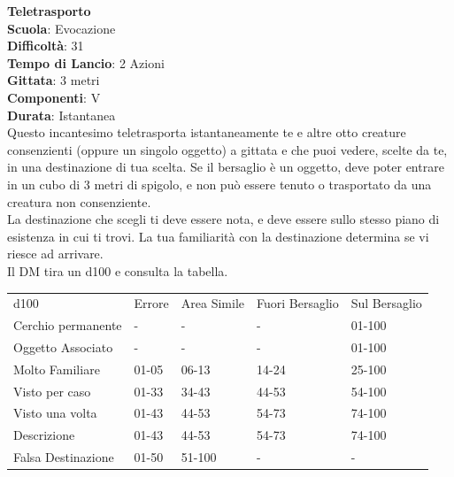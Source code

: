 \begin{multicols}{2}
\medskip\textbf{Teletrasporto}\\
\textbf{Scuola}: Evocazione\\
\textbf{Difficoltà}: 31\\
\textbf{Tempo di Lancio}: 2 Azioni\\
\textbf{Gittata}: 3 metri\\
\textbf{Componenti}: V\\
\textbf{Durata}: Istantanea\\
Questo incantesimo teletrasporta istantaneamente te e altre otto creature consenzienti (oppure un singolo oggetto) a gittata e che puoi vedere, scelte da te, in una destinazione di tua scelta. Se il bersaglio è un oggetto, deve poter entrare in un cubo di 3 metri di spigolo, e non può essere tenuto o trasportato da una creatura non consenziente.\\
La destinazione che scegli ti deve essere nota, e deve essere sullo stesso piano di esistenza in cui ti trovi. La tua familiarità con la destinazione determina se vi riesce ad arrivare.\\
Il DM tira un d100 e consulta la tabella.
\end{multicols}
\medskip
\begin{tabular}{lllll}
\toprule
d100 				&	Errore		&	Area Simile	&Fuori Bersaglio&Sul Bersaglio\\
Cerchio permanente	&-	&-	&-	&01-100\\
Oggetto Associato	&-	&-	&-	&01-100\\
Molto Familiare		&01-05	&06-13	&14-24	&25-100\\
Visto per caso		&01-33	&34-43	&44-53	&54-100\\
Visto una volta		&01-43	&44-53	&54-73	&74-100\\
Descrizione			&01-43	&44-53	&54-73	&74-100\\
Falsa Destinazione	&01-50	&51-100	&-	&-\\
\end{tabular}
\medskip
